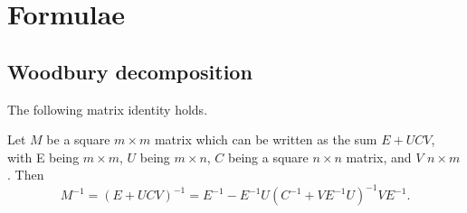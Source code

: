 \chapter{Formulae}
\section{Woodbury decomposition}
\label{sec:wood}
The following matrix identity holds.
\begin{proposition}
	Let $M$ be a square $m\times m$ matrix which can be written as the sum $E+UCV$, with E being $m \times m$, $U$ being $m\times n$, $C$ being a square $n\times n$ matrix, and $V$ $n\times m$. Then
	\begin{equation}
		\label{wood}
		M^{-1}=
		\left(E + UCV \right)^{-1} = E^{-1} - E^{-1}U\left(C^{-1} + V E^{-1}U\right)^{-1}V E^{-1}.
	\end{equation}
\end{proposition}

